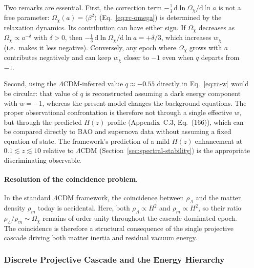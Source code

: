       Two remarks are essential.
      First, the correction term $-\tfrac{1}{3}\,\mathrm{d}\ln\Omega_\chi/\mathrm{d}\ln a$
      is not a free parameter: $\Omega_\chi(a) = \langle\beta^2\rangle$
      (Eq.~\eqref{eq:rc-omega}) is determined by the relaxation dynamics.
      Its contribution can have either sign.
      If $\Omega_\chi$ decreases as $\Omega_\chi \propto a^{-\delta}$ with
      $\delta > 0$, then
      $-\tfrac{1}{3}\,\mathrm{d}\ln\Omega_\chi/\mathrm{d}\ln a = +\delta/3$,
      which increases $w_\chi$ (i.e.\ makes it less negative).
      Conversely, any epoch where $\Omega_\chi$ grows with $a$ contributes
      negatively and can keep $w_\chi$ closer to $-1$ even when $q$ departs
      from $-1$.

      Second, using the $\Lambda$CDM-inferred value $q \approx -0.55$
      directly in Eq.~\eqref{eq:rc-w} would be circular: that value of $q$
      is reconstructed assuming a dark energy component with $w = -1$,
      whereas the present model changes the background equations.
      The proper observational confrontation is therefore not through a
      single effective $w$, but through the predicted $H(z)$ profile
      (Appendix~C.3, Eq.~(166)), which can be compared directly to
      BAO and supernova data without assuming a fixed equation of state.
      The framework's prediction of a mild $H(z)$ enhancement at
      $0.1 \lesssim z \lesssim 10$ relative to $\Lambda$CDM
      (Section~\ref{sec:spectral-stability}) is the appropriate discriminating observable.

    \paragraph{Resolution of the coincidence problem.}
      In the standard $\Lambda$CDM framework, the coincidence between
      $\rho_\Lambda$ and the matter density $\rho_m$ today is accidental.
      Here, both $\rho_\Lambda \propto H^2$ and $\rho_m \propto H^2$, so their ratio
      $\rho_\Lambda / \rho_m \sim \Omega_\chi$ remains of order unity
      throughout the cascade-dominated epoch.
      The coincidence is therefore a structural consequence of the single
      projective cascade driving both matter inertia and residual vacuum energy.

  \subsubsection*{Discrete Projective Cascade and the Energy Hierarchy}
    \label{sec:relax-cascade-hier}

